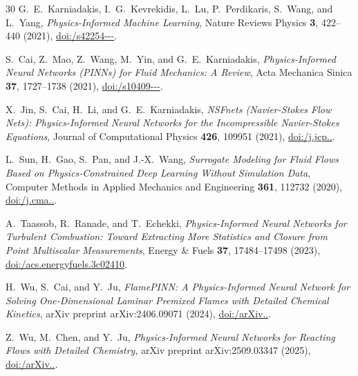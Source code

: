 \documentclass[reprint,aps,prfluids,superscriptaddress,twocolumn,floatfix]{revtex4-2}
\begin{document}
\begin{thebibliography}{30}
 G.~E.~Karniadakis, I.~G.~Kevrekidis, L.~Lu, P.~Perdikaris, S.~Wang, and L.~Yang, \textit{Physics-Informed Machine Learning}, Nature Reviews Physics \textbf{3}, 422--440 (2021), \href{https://doi.org/10.1038/s42254-021-00314-5}{doi:/\allowbreak s42254---}.

 S.~Cai, Z.~Mao, Z.~Wang, M.~Yin, and G.~E.~Karniadakis, \textit{Physics-Informed Neural Networks (PINNs) for Fluid Mechanics: A Review}, Acta Mechanica Sinica \textbf{37}, 1727--1738 (2021), \href{https://doi.org/10.1007/s10409-021-01148-1}{doi:/\allowbreak s10409---}.

 X.~Jin, S.~Cai, H.~Li, and G.~E.~Karniadakis, \textit{NSFnets (Navier-Stokes Flow Nets): Physics-Informed Neural Networks for the Incompressible Navier-Stokes Equations}, Journal of Computational Physics \textbf{426}, 109951 (2021), \href{https://doi.org/10.1016/j.jcp.2020.109951}{doi:/\allowbreak j.\allowbreak jcp..}.

 L.~Sun, H.~Gao, S.~Pan, and J.-X.~Wang, \textit{Surrogate Modeling for Fluid Flows Based on Physics-Constrained Deep Learning Without Simulation Data}, Computer Methods in Applied Mechanics and Engineering \textbf{361}, 112732 (2020), \href{https://doi.org/10.1016/j.cma.2019.112732}{doi:/\allowbreak j.\allowbreak cma..}.

 A.~Taassob, R.~Ranade, and T.~Echekki, \textit{Physics-Informed Neural Networks for Turbulent Combustion: Toward Extracting More Statistics and Closure from Point Multiscalar Measurements}, Energy \& Fuels \textbf{37}, 17484--17498 (2023), \href{https://doi.org/10.1021/acs.energyfuels.3c02410}{doi:/\allowbreak acs.\allowbreak energyfuels.\allowbreak 3c02410}.

 H.~Wu, S.~Cai, and Y.~Ju, \textit{FlamePINN: A Physics-Informed Neural Network for Solving One-Dimensional Laminar Premixed Flames with Detailed Chemical Kinetics}, arXiv preprint arXiv:2406.09071 (2024), \href{https://doi.org/10.48550/arXiv.2406.09071}{doi:/\allowbreak arXiv..}.

 Z.~Wu, M.~Chen, and Y.~Ju, \textit{Physics-Informed Neural Networks for Reacting Flows with Detailed Chemistry}, arXiv preprint arXiv:2509.03347 (2025), \href{https://doi.org/10.48550/arXiv.2509.03347}{doi:/\allowbreak arXiv..}.


\end{thebibliography}
\end{document}
